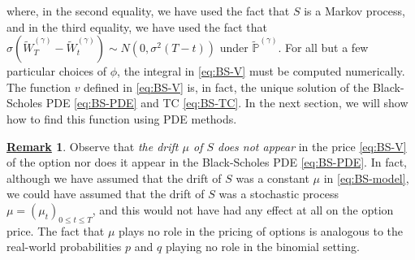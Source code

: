 \documentclass[12pt]{book}
\numberwithin{equation}{chapter}
\theoremstyle{plain}
\numberwithin{theorem}{section}
\theoremstyle{definition}
\newtheorem{remark}[theorem]{\underline{Remark}}
\numberwithin{exercise}{chapter}
\newcommand{\<}{\langle}
\renewcommand{\>}{\rangle}
\renewcommand{\(}{\left(}
\renewcommand{\)}{\right)}
\renewcommand{\[}{\left[}
\renewcommand{\]}{\right]}
\newcommand\Pb{\mathds{P}}
\newcommand\sig{\sigma}
\newcommand\gam{\gamma}
\newcommand\Pbt{\widetilde{\Pb}}
\newcommand\Wt{\widetilde{W}}
\theoremstyle{definition}
\numberwithin{question}{section}
\begin{document}
where, in the second equality, we have used the fact that $S$ is a Markov process, and in the third equality, we have used the fact that $\sig ( \Wt^{(\gam)}_T - \Wt^{(\gam)}_t ) \sim N(0,\sig^2(T-t))$ under $\Pbt^{(\gam)}$.  For all but a few particular choices of $\phi$, the integral in \eqref{eq:BS-V} must be computed numerically.  The function $v$ defined in \eqref{eq:BS-V} is, in fact, the unique solution of the Black-Scholes PDE \eqref{eq:BS-PDE} and TC \eqref{eq:BS-TC}.  In the next section, we will show how to find this function using PDE methods.

\begin{remark}
\label{rmk:drift}
Observe that \textit{the drift $\mu$ of $S$ does not appear} in the price \eqref{eq:BS-V} of the option nor does it appear in the Black-Scholes PDE \eqref{eq:BS-PDE}.  In fact, although we have assumed that the drift of $S$ was a constant $\mu$ in \eqref{eq:BS-model}, we could have assumed that the drift of $S$ was a stochastic process $\mu = (\mu_t)_{0 \leq t \leq T}$, and this would not have had any effect at all on the option price.  The fact that $\mu$ plays no role in the pricing of options is analogous to the real-world probabilities $p$ and $q$ playing no role in the binomial setting.
\end{remark}
\end{document}
